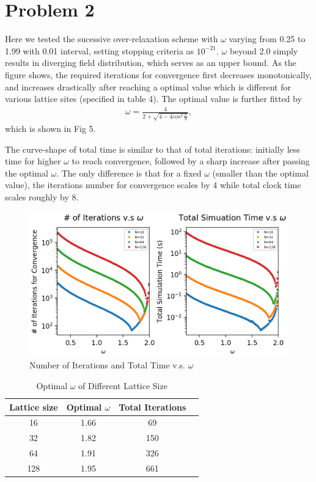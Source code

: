 \documentclass[a4paper,10pt]{article}
\begin{document}
\begin{large}
\end{large}

\newpage
\section*{Problem 2}
\begin{large}
Here we tested the sucessive over-relaxation scheme with $\omega$ varying from 0.25 to 1.99 with 0.01 interval, setting stopping criteria as $10^{-21}$. $\omega$ beyond 2.0 simply results in diverging field distribution, which serves as an upper bound. As the figure shows, the required iterations for convergence first decreases monotonically, and increases drastically after reaching a optimal value which is different for various lattice sites (specified in table 4). The optimal value is further fitted by
\begin{align*}
\omega = \frac{4}{2+\sqrt{4-4cos^2\frac{\pi}{N}}},
\end{align*}
which is shown in Fig 5.

 The curve-shape of total time is similar to that of total iterations: initially less time for higher $\omega$ to reach convergence, followed by a sharp increase after passing the optimal $\omega$. The only difference is that for a fixed $\omega$ (smaller than the optimal value), the iterations number for convergence scales by 4 while total clock time scales roughly by 8. 

\begin{figure}[htbp] %
\centering %
\includegraphics[width=15cm]{Problem_2_Optimal_omega_Fixed_Boundary.png} %
\caption{Number of Iterations and Total Time v.s. $\omega$}
\end{figure}

\begin{table}[h]  %
\centering  %
\begin{tabular}[t]{|c|c|c|c|}
\hline
Lattice size&Optimal $\omega$& Total Iterations\\
\hline
16&1.66&69\\
\hline
32&1.82&150\\
\hline
64&1.91&326\\
\hline
128& 1.95&661\\
\hline
\end{tabular}
\caption{Optimal $\omega$ of Different Lattice Size}  %
\end{table}


\end{large}
\end{document}
